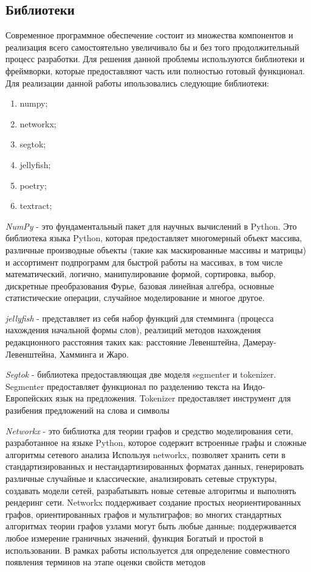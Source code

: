 \subsection{Библиотеки}
Современное программное обеспечение cостоит из множества компонентов и реализация всего самостоятельно увеличивало бы и без того продолжительный процесс разработки.
Для решения данной проблемы используются библиотеки и фреймворки, которые предоставляют часть или полностью готовый функционал.
Для реализации данной работы ипользовались следующие библиотеки:
\begin{enumerate}
	\item numpy;
	\item networkx;
	\item segtok;
	\item jellyfish;
	\item poetry;
	\item textract;
\end{enumerate}
\textit{NumPy} - это фундаментальный пакет для научных вычислений в Python. 
Это библиотека языка Python, которая предоставляет многомерный объект массива, различные производные объекты (такие как маскированные массивы и матрицы) и ассортимент подпрограмм для быстрой работы на массивах, в том числе математический, логично, манипулирование формой, сортировка, выбор, дискретные преобразования Фурье, базовая линейная алгебра, основные статистические операции, случайное моделирование и многое другое.

\textit{jellyfish} -  представляет из себя набор функций для стемминга (процесса нахождения начальной формы слов), реалзиций методов нахождения редакционного расстояния таких как: расстояние Левенштейна, Дамерау-Левенштейна, Хамминга и Жаро.

\textit{Segtok} - библиотека предоставляющая две моделя segmenter и tokenizer. Segmenter предоставляет функционал по разделению текста на Индо-Европейских язык на предложения.
Tokenizer предоставляет инструмент для разибения предложений на слова и символы

\textit{Networkx} - это библиотка для теории графов и средство моделирования сети, разработанное на языке Python, которое содержит встроенные графы и сложные алгоритмы сетевого анализа
Используя networkx, позволяет хранить сети в стандартизированных и нестандартизированных форматах данных, генерировать различные случайные и классические, анализировать сетевые структуры, создавать модели сетей, разрабатывать новые сетевые алгоритмы и выполнять рендеринг сети.
Networkx поддерживает создание простых неориентированных графов, ориентированных графов и мультиграфов; во многих стандартных алгоритмах теории графов узлами могут быть любые данные; поддерживается любое измерение граничных значений, функция Богатый и простой в использовании.
В рамках работы используется для определение совместного появления терминов на этапе оценки свойств методов


